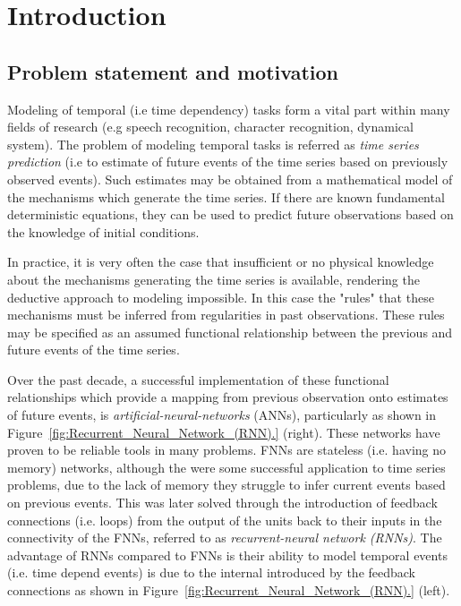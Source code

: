 \documentclass{WitsPhysicsReport}
\begin{document}
\maketitle

\section{Introduction}
\label{sec:Introduction}

\subsection{Problem statement and motivation}
\label{sec: Introduction_to_sequence_model}




Modeling of temporal (i.e time dependency) tasks form a vital part within many fields of research (e.g speech recognition, character recognition, dynamical system). The problem of modeling temporal tasks is referred as \textit{time series prediction} (i.e to estimate of future events of the time series based on previously observed events). Such estimates may be obtained from a mathematical model of the mechanisms which generate the time series. If there are known fundamental deterministic equations, they can be used to predict future observations based on the knowledge of initial conditions. 

In practice, it is very often the case that insufficient or no physical knowledge about the mechanisms generating the time series is available, rendering the deductive approach to modeling impossible. In this case the "rules" that these mechanisms must be inferred from regularities in past observations. These rules may be specified as an assumed functional relationship between the previous and future events of the time series.

Over the past decade, a successful implementation of these functional relationships which provide a mapping from previous observation onto estimates of future events, is \textit{artificial-neural-networks} (ANNs), particularly  as shown in Figure~\ref{fig:Recurrent_Neural_Network_(RNN).} (right). These networks have proven to be reliable tools in many problems. FNNs are stateless (i.e. having no memory) networks, although the were some successful application to time series problems, due to the lack of memory they struggle to infer current events based on previous events. This was later solved through the introduction of feedback connections (i.e. loops) from the output of the units back to their inputs in the connectivity of the FNNs, referred to as \textit{recurrent-neural network (RNNs)}. The advantage of RNNs compared to FNNs is their ability to model temporal events (i.e. time depend events) is due to the internal  introduced by the feedback connections as shown in Figure~\ref{fig:Recurrent_Neural_Network_(RNN).} (left).
\end{document}

